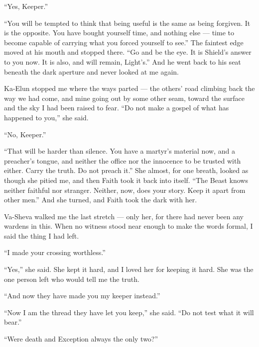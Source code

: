 ``Yes, Keeper.''\par

``You will be tempted to think that being useful is the same as being forgiven. It is the opposite. You have bought yourself time, and nothing else --- time to become capable of carrying what you forced yourself to see.'' The faintest edge moved at his mouth and stopped there. ``Go and be the eye. It is Shield's answer to you now. It is also, and will remain, Light's.'' And he went back to his seat beneath the dark aperture and never looked at me again.\par

Ka-Elun stopped me where the ways parted --- the others' road climbing back the way we had come, and mine going out by some other seam, toward the surface and the sky I had been raised to fear. ``Do not make a gospel of what has happened to you,'' she said.\par

``No, Keeper.''\par

``That will be harder than silence. You have a martyr's material now, and a preacher's tongue, and neither the office nor the innocence to be trusted with either. Carry the truth. Do not preach it.'' She almost, for one breath, looked as though she pitied me, and then Faith took it back into itself. ``The Beast knows neither faithful nor stranger. Neither, now, does your story. Keep it apart from other men.'' And she turned, and Faith took the dark with her.\par

Va-Sheva walked me the last stretch --- only her, for there had never been any wardens in this. When no witness stood near enough to make the words formal, I said the thing I had left.\par

``I made your crossing worthless.''\par

``Yes,'' she said. She kept it hard, and I loved her for keeping it hard. She was the one person left who would tell me the truth.\par

``And now they have made you my keeper instead.''\par

``Now I am the thread they have let you keep,'' she said. ``Do not test what it will bear.''\par

``Were death and Exception always the only two?''\par

